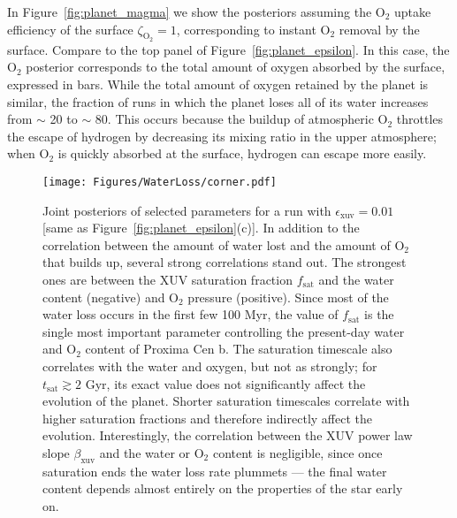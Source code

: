 \documentclass[preprint,12pt]{aastex}
\begin{document}
In Figure~\ref{fig:planet_magma} we show the posteriors assuming the O$_2$ uptake
efficiency of the surface $\zeta_\mathrm{O_2} = 1$, corresponding to instant O$_2$ removal by the surface. Compare
to the top panel of Figure~\ref{fig:planet_epsilon}. In this case, the O$_2$ posterior corresponds to the total amount
of oxygen absorbed by the surface, expressed in bars. While the total amount of oxygen retained by the planet
is similar, the fraction of runs in which the planet loses all of its water increases from $\sim$ 20 to $\sim$ 80.
This occurs because the buildup of atmospheric O$_2$ throttles the escape of hydrogen by decreasing its mixing
ratio in the upper atmosphere; when O$_2$ is quickly absorbed at the surface, hydrogen can escape more easily.

\begin{figure}[hbt]
 \begin{center}
     \texttt{[image: Figures/WaterLoss/corner.pdf]}
      \caption{Joint posteriors of selected parameters for a run with $\epsilon_\mathrm{xuv} = 0.01$ [same as
       Figure~\ref{fig:planet_epsilon}(c)]. In addition to the correlation between the amount of water
       lost and the amount of O$_2$ that builds up, several strong correlations stand out.
       The strongest ones are between the XUV saturation fraction $f_\mathrm{sat}$ and
       the water content (negative) and O$_2$ pressure (positive). Since most of the water loss occurs 
       in the first few 100 Myr, the value of $f_\mathrm{sat}$ is the single most important parameter
       controlling the present-day water and O$_2$ content of Proxima Cen b. The saturation timescale
       also correlates with the water and oxygen, but not as strongly; for $t_\mathrm{sat} \gtrsim 2$ Gyr,
       its exact value does not significantly affect the evolution of the planet. Shorter saturation
       timescales correlate with higher saturation fractions and therefore indirectly affect the evolution. 
       Interestingly, the correlation between the XUV power law slope $\beta_\mathrm{xuv}$ and the water or
       O$_2$ content is negligible, since once saturation ends the water loss rate plummets --- the final
       water content depends almost entirely on the properties of the star early on.}
    \label{fig:corner}
 \end{center}
\end{figure}
\end{document}
